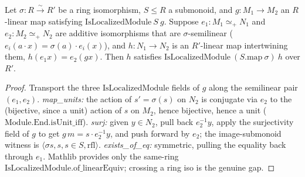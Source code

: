 
\begin{lemma}
  \label{lem:isLocalizedModule_ringEquiv_semilinear}
  Let \(\sigma : R \xrightarrow{\sim} R'\) be a ring isomorphism, \(S \le R\) a submonoid, and
  \(g : M_1 \to M_2\) an \(R\)-linear map satisfying \(\mathrm{IsLocalizedModule}\ S\ g\). Suppose
  \(e_1 : M_1 \simeq_+ N_1\) and \(e_2 : M_2 \simeq_+ N_2\) are additive isomorphisms that are
  \(\sigma\)-semilinear (\(e_i(a \cdot x) = \sigma(a) \cdot e_i(x)\)), and \(h : N_1 \to N_2\) is an
  \(R'\)-linear map intertwining them, \(h(e_1 x) = e_2(g x)\). Then \(h\) satisfies
  \(\mathrm{IsLocalizedModule}\ (S.\mathrm{map}\ \sigma)\ h\) over \(R'\).
\end{lemma}
\begin{proof}
  Transport the three \(\mathrm{IsLocalizedModule}\) fields of \(g\) along the semilinear pair
  \((e_1,e_2)\). \emph{map\_units:} the action of \(s' = \sigma(s)\) on \(N_2\) is conjugate via \(e_2\) to
  the (bijective, since a unit) action of \(s\) on \(M_2\), hence bijective, hence a unit
  (\(\mathrm{Module.End.isUnit\_iff}\)). \emph{surj:} given \(y \in N_2\), pull back \(e_2^{-1}y\), apply
  the surjectivity field of \(g\) to get \(g\,m = s\cdot e_2^{-1}y\), and push forward by \(e_2\); the
  image-submonoid witness is \(\langle \sigma s, s, s\in S, \mathrm{rfl}\rangle\). \emph{exists\_of\_eq:}
  symmetric, pulling the equality back through \(e_1\). Mathlib provides only the same-ring
  \(\mathrm{IsLocalizedModule.of\_linearEquiv}\); crossing a ring iso is the genuine gap.
\end{proof}

